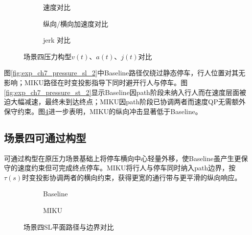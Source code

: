 \begin{figure}[H]
\centering
\begin{subfigure}[b]{\textwidth}
  \centering
  
  \caption{速度对比}
  \label{fig:exp_ch7_pressure_va_2:a}
\end{subfigure}

\begin{subfigure}[b]{\textwidth}
  \centering
  
  \caption{纵向/横向加速度对比}
  \label{fig:exp_ch7_pressure_va_2:b}
\end{subfigure}

\begin{subfigure}[b]{\textwidth}
  \centering
  
  \caption{jerk 对比}
  \label{fig:exp_ch7_pressure_va_2:c}
\end{subfigure}
\caption{场景四压力构型$v(t)$、$a(t)$、$j(t)$对比}
\label{fig:exp_ch7_pressure_va_2}
\end{figure}

图\ref{fig:exp_ch7_pressure_sl_2}中Baseline路径仅绕过静态停车，行人位置对其无影响；MIKU路径在时变投影指导下同时避开行人与停车。图\ref{fig:exp_ch7_pressure_st_2}显示Baseline因path阶段未纳入行人而在速度层面被迫大幅减速，最终未到达终点；MIKU因path阶段已协调两者而速度QP无需额外保守约束。图\ref{fig:exp_ch7_pressure_va_2}进一步表明，MIKU的纵向冲击显著低于Baseline。

\subsection{场景四可通过构型}

可通过构型在原压力场景基础上将停车横向中心轻量外移，使Baseline虽产生更保守的速度约束但可完成终点停车。MIKU将行人与停车同时纳入path边界，按$\tau(s)$时变投影协调两者的横向约束，获得更宽的通行带与更平滑的纵向响应。

\begin{figure}[H]
\centering
\begin{subfigure}[b]{\textwidth}
  \centering
  
  \caption{Baseline}
  \label{fig:exp_ch7_sl_2:a}
\end{subfigure}

\begin{subfigure}[b]{\textwidth}
  \centering
  
  \caption{MIKU}
  \label{fig:exp_ch7_sl_2:b}
\end{subfigure}
\caption{场景四SL平面路径与边界对比}
\label{fig:exp_ch7_sl_2}
\end{figure}


